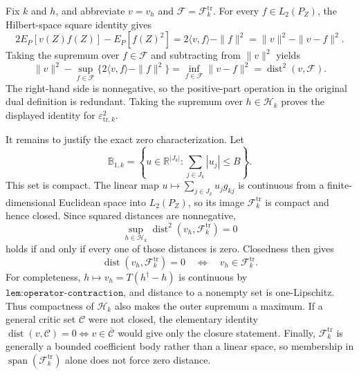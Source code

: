 Fix \(k\) and \(h\), and abbreviate \(v=v_h\) and \(\mathcal F=\mathcal F_k^{\mathrm{tr}}\). For every \(f\in L_2(P_Z)\), the Hilbert-space square identity gives
\[
 2E_P[v(Z)f(Z)]-E_P[f(Z)^2]
 =2\langle v,f\rangle-\|f\|^2
 =\|v\|^2-\|v-f\|^2.
\]
Taking the supremum over \(f\in\mathcal F\) and subtracting from \(\|v\|^2\) yields
\[
 \|v\|^2-\sup_{f\in\mathcal F}
 \{2\langle v,f\rangle-\|f\|^2\}
 =\inf_{f\in\mathcal F}\|v-f\|^2
 =\operatorname{dist}^2(v,\mathcal F).
\]
The right-hand side is nonnegative, so the positive-part operation in the original dual definition is redundant. Taking the supremum over \(h\in\mathcal H_k\) proves the displayed identity for \(\varepsilon_{\mathrm{tr},k}^2\).

It remains to justify the exact zero characterization. Let
\[
 \mathbb B_{1,k}=\left\{u\in\mathbb R^{|J_k|}:\sum_{j\in J_k}|u_j|\le B\right\}.
\]
This set is compact. The linear map \(u\mapsto\sum_{j\in J_k}u_jg_{kj}\) is continuous from a finite-dimensional Euclidean space into \(L_2(P_Z)\), so its image \(\mathcal F_k^{\mathrm{tr}}\) is compact and hence closed. Since squared distances are nonnegative,
\[
 \sup_{h\in\mathcal H_k}
 \operatorname{dist}^2(v_h,\mathcal F_k^{\mathrm{tr}})=0
\]
holds if and only if every one of those distances is zero. Closedness then gives
\[
 \operatorname{dist}(v_h,\mathcal F_k^{\mathrm{tr}})=0
 \quad\Longleftrightarrow\quad
 v_h\in\mathcal F_k^{\mathrm{tr}}.
\]
For completeness, \(h\mapsto v_h=T(h^\dagger-h)\) is continuous by \(\texttt{lem:operator-contraction}\), and distance to a nonempty set is one-Lipschitz. Thus compactness of \(\mathcal H_k\) also makes the outer supremum a maximum. If a general critic set \(\mathcal C\) were not closed, the elementary identity \(\operatorname{dist}(v,\mathcal C)=0\iff v\in\overline{\mathcal C}\) would give only the closure statement. Finally, \(\mathcal F_k^{\mathrm{tr}}\) is generally a bounded coefficient body rather than a linear space, so membership in \(\operatorname{span}(\mathcal F_k^{\mathrm{tr}})\) alone does not force zero distance.